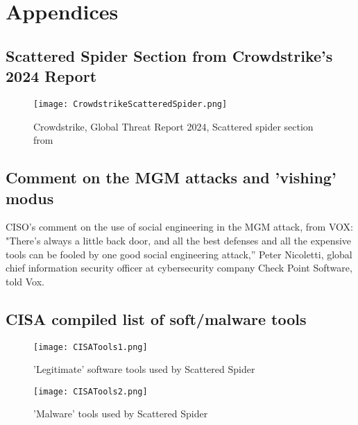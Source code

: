 \documentclass[
	letterpaper, %
	10pt, %
	unnumberedsections, %
	twoside, %
]{APAAssignment}
\begin{document}
\clearpage
\chapter{Appendices}
\begin{appendices}
	\section{Scattered Spider Section from Crowdstrike's 2024 Report}\label{app:CrowdStrikeScatteredSpider}

	\begin{figure}[!htp] %
		\centering
		\texttt{[image: CrowdstrikeScatteredSpider.png]}
		\caption{Crowdstrike, Global Threat Report 2024, Scattered spider section from \cite{CrowdStrikeGTR2024}}
		\label{fig:CrowdStrikeScatteredSpider}
	\end{figure}

	\section{Comment on the MGM attacks and 'vishing' modus}\label{app:voxSocialEngQuote}
	CISO's comment on the use of social engineering in the MGM attack, from VOX\cite{VOXonMGM-Hack}: \\
	"There’s always a little back door, and all the best defenses and all the expensive tools can be fooled by one good social engineering attack,” Peter Nicoletti, global chief information security officer at cybersecurity company Check Point Software, told Vox.

	\section{CISA compiled list of soft/malware tools}\label{app:SoftwareTools}

	\begin{figure}[!htp] %
		\centering
		\texttt{[image: CISATools1.png]}
		\caption{'Legitimate' software tools used by Scattered Spider\cite{CISA_ScattetedSpider}}
		\label{fig:CISATools1}
	\end{figure}

	\begin{figure}[!htp] %
		\centering
		\texttt{[image: CISATools2.png]}
		\caption{'Malware' tools used by Scattered Spider\cite{CISA_ScattetedSpider}}
		\label{fig:CISATools2}
	\end{figure}


\end{appendices}
\end{document}
